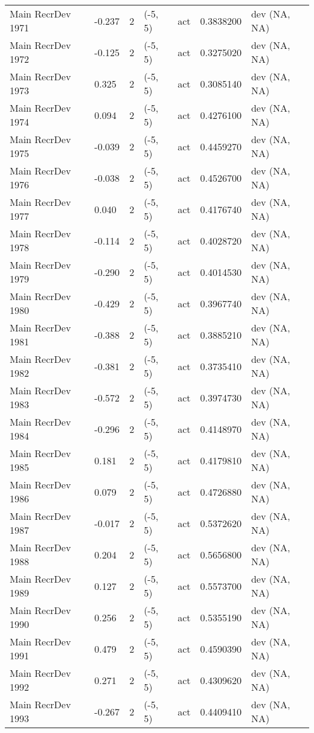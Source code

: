 \documentclass[11pt,
  english,
  letterpaper,
]{article}
\begin{document}
\begin{landscape}
\begin{longtable}[t]{>{\raggedright\arraybackslash}p{7cm}lllll>{\raggedright\arraybackslash}p{4cm}}
Main RecrDev 1971 & -0.237 & 2 & (-5, 5) & act & 0.3838200 & dev (NA, NA)\\
Main RecrDev 1972 & -0.125 & 2 & (-5, 5) & act & 0.3275020 & dev (NA, NA)\\
Main RecrDev 1973 & 0.325 & 2 & (-5, 5) & act & 0.3085140 & dev (NA, NA)\\
Main RecrDev 1974 & 0.094 & 2 & (-5, 5) & act & 0.4276100 & dev (NA, NA)\\
Main RecrDev 1975 & -0.039 & 2 & (-5, 5) & act & 0.4459270 & dev (NA, NA)\\
Main RecrDev 1976 & -0.038 & 2 & (-5, 5) & act & 0.4526700 & dev (NA, NA)\\
Main RecrDev 1977 & 0.040 & 2 & (-5, 5) & act & 0.4176740 & dev (NA, NA)\\
Main RecrDev 1978 & -0.114 & 2 & (-5, 5) & act & 0.4028720 & dev (NA, NA)\\
Main RecrDev 1979 & -0.290 & 2 & (-5, 5) & act & 0.4014530 & dev (NA, NA)\\
Main RecrDev 1980 & -0.429 & 2 & (-5, 5) & act & 0.3967740 & dev (NA, NA)\\
Main RecrDev 1981 & -0.388 & 2 & (-5, 5) & act & 0.3885210 & dev (NA, NA)\\
Main RecrDev 1982 & -0.381 & 2 & (-5, 5) & act & 0.3735410 & dev (NA, NA)\\
Main RecrDev 1983 & -0.572 & 2 & (-5, 5) & act & 0.3974730 & dev (NA, NA)\\
Main RecrDev 1984 & -0.296 & 2 & (-5, 5) & act & 0.4148970 & dev (NA, NA)\\
Main RecrDev 1985 & 0.181 & 2 & (-5, 5) & act & 0.4179810 & dev (NA, NA)\\
Main RecrDev 1986 & 0.079 & 2 & (-5, 5) & act & 0.4726880 & dev (NA, NA)\\
Main RecrDev 1987 & -0.017 & 2 & (-5, 5) & act & 0.5372620 & dev (NA, NA)\\
Main RecrDev 1988 & 0.204 & 2 & (-5, 5) & act & 0.5656800 & dev (NA, NA)\\
Main RecrDev 1989 & 0.127 & 2 & (-5, 5) & act & 0.5573700 & dev (NA, NA)\\
Main RecrDev 1990 & 0.256 & 2 & (-5, 5) & act & 0.5355190 & dev (NA, NA)\\
Main RecrDev 1991 & 0.479 & 2 & (-5, 5) & act & 0.4590390 & dev (NA, NA)\\
Main RecrDev 1992 & 0.271 & 2 & (-5, 5) & act & 0.4309620 & dev (NA, NA)\\
Main RecrDev 1993 & -0.267 & 2 & (-5, 5) & act & 0.4409410 & dev (NA, NA)\\

\end{longtable}
\end{landscape}
\end{document}
